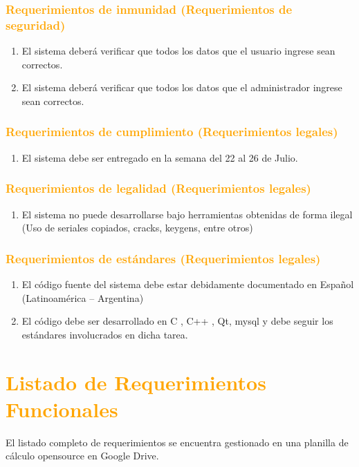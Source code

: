 \subsubsection{\textcolor{orange}{Requerimientos de inmunidad
(Requerimientos de seguridad)}}
\begin{enumerate}
\item El sistema deberá verificar que todos los datos que el usuario ingrese
sean correctos.
\item El sistema deberá verificar que todos los datos que el administrador
ingrese sean correctos.
\end{enumerate}

\subsubsection{\textcolor{orange}{Requerimientos de cumplimiento
(Requerimientos legales)}}
\begin{enumerate}
\item El sistema debe ser entregado en la semana del 22 al 26 de Julio.
\end{enumerate}


\subsubsection{\textcolor{orange}{Requerimientos de legalidad (Requerimientos
legales)}}
\begin{enumerate}
\item El sistema no puede desarrollarse bajo herramientas obtenidas de forma
ilegal (Uso de seriales copiados, cracks, keygens, entre otros)
\end{enumerate}

\subsubsection{\textcolor{orange}{Requerimientos de estándares (Requerimientos
legales)}}
\begin{enumerate}
\item El código fuente del sistema debe estar debidamente documentado en
Español (Latinoamérica – Argentina)
\item El código debe ser desarrollado en C , C++ , Qt, mysql y debe seguir los
estándares involucrados en dicha tarea.
\end{enumerate}


\newpage
\section{\textcolor{orange}{Listado de Requerimientos Funcionales}}
El listado completo de requerimientos se encuentra gestionado en una planilla de
cálculo opensource en Google Drive.


